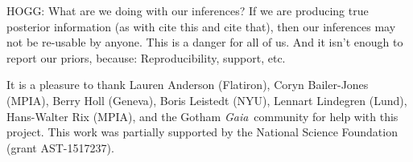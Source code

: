 \documentclass[12pt, modern]{aastex62}
\newcommand{\acronym}[1]{{\small{#1}}}
\newcommand{\Gaia}{\textsl{Gaia}}
\begin{document}
HOGG: What are we doing with our inferences? If we are producing true posterior
information (as with cite this and cite that), then our inferences may not
be re-usable by anyone. This is a danger for all of us. And it isn't enough
to report our priors, because: Reproducibility, support, etc.

\acknowledgements
It is a pleasure to thank
  Lauren Anderson (Flatiron),
  Coryn Bailer-Jones (MPIA),
  Berry Holl (Geneva),
  Boris Leistedt (NYU),
  Lennart Lindegren (Lund),
  Hans-Walter Rix (MPIA),
and the Gotham \Gaia\ community for help with this project.
This work was partially supported by
  the National Science Foundation (grant \acronym{AST-1517237}).


\end{document}
